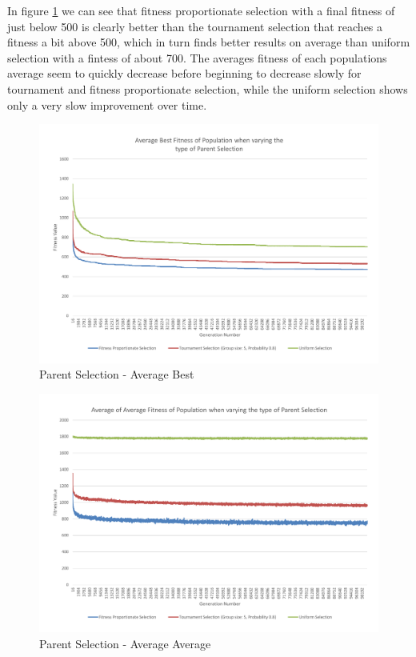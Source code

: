 In figure \ref{fig:ctpsab} we can see that fitness proportionate selection with a final fitness of just below 500 is clearly better than the tournament selection that reaches a fitness a bit above 500, which in turn finds better results on average than uniform selection with a fintess of about 700. The averages fitness of each populations average seem to quickly decrease before beginning to decrease slowly for tournament and fitness proportionate selection, while the uniform selection shows only a very slow improvement over time.

\begin{figure}[thbp]
	\centerline{\includegraphics[width=\paperwidth]{figures/CircleTests/ParentSelection/CircleTestParentSelectionAverageBest.pdf}}
	\caption{Parent Selection - Average Best}
	\label{fig:ctpsab}
\end{figure}

\begin{figure}[thbp]
	\centerline{\includegraphics[width=\paperwidth]{figures/CircleTests/ParentSelection/CircleTestParentSelectionAverageAverage.pdf}}
	\caption{Parent Selection - Average Average}
\end{figure}

